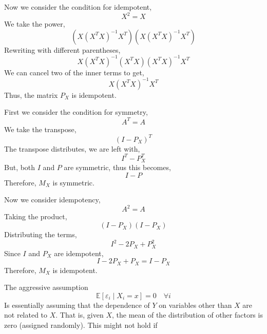 \documentclass[12pt,twoside]{article}
\begin{document}
\begin{problems}
Now we consider the condition for idempotent,
$$ X^2 = X $$
We take the power,
$$ \left(X \left(X^T X\right)^{-1} X^T\right) \left(X \left(X^T X\right)^{-1} 
X^T\right) $$
Rewriting with different parentheses,
$$ X \left(X^T X\right)^{-1} \left(X^T X\right) \left(X^T X\right)^{-1} 
X^T $$
We can cancel two of the inner terms to get,
$$ X \left(X^T X\right)^{-1} X^T $$
Thus, the matrix $P_X$ is idempotent.

\problem  %

First we consider the condition for symmetry,
$$ A^T = A $$
We take the transpose,
$$ \left(I - P_X\right)^T $$
The transpose distributes, we are left with,
$$ I^T - P_X^T $$
But, both $I$ and $P$ are symmetric, thus this becomes,
$$ I - P $$
Therefore, $M_X$ is symmetric.

Now we consider idempotency,
$$ A^2 = A $$
Taking the product,
$$ (I - P_X)(I - P_X) $$
Distributing the terms,
$$ I^2 - 2P_X + P_X^2 $$
Since $I$ and $P_X$ are idempotent,
$$ I - 2P_X + P_X = I - P_X $$
Therefore, $M_X$ is idempotent.

\newpage

\problem  %

The aggressive assumption
$$ \mathbb{E}[\varepsilon_i \mid X_i = x] = 0\quad \forall i $$
Is essentially assuming that the dependence of $Y$ on variables other than
$X$ are not related to $X$. That is, given $X$, the mean of the distribution
of other factors is zero (assigned randomly). This might not hold if

\problem  %

\problem  %

\problem  %

\newpage

\problem  %

\problem  %

\problem  %

\problem  %

\problem  %

\problem  %

\begin{problemparts}

\problempart  %

\problempart  %

\problempart  %

\end{problemparts}


\end{problems}
\end{document}

